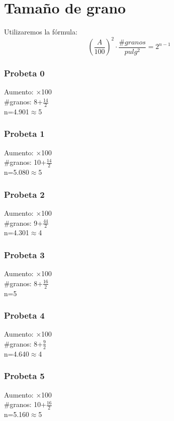 \documentclass[a4paper,12pt]{report}
\begin{document}
\section{Tamaño de grano}
Utilizaremos la fórmula:
$$
\left(\frac{A}{100}\right)^{2}\cdot\frac{\#granos}{pulg^{2}}=2^{n-1}
$$
\subsubsection{Probeta 0}
\hspace{-19pt}Aumento: $\times$100\\
$\#$granos: 8+$\frac{14}{2}$\\
n=4.901$\approx$5
\subsubsection{Probeta 1}
\hspace{-19pt}Aumento: $\times$100\\
$\#$granos: 10+$\frac{14}{2}$\\
n=5.080$\approx$5
\subsubsection{Probeta 2}
\hspace{-19pt}Aumento: $\times$100\\
$\#$granos: 9+$\frac{44}{2}$\\
n=4.301$\approx$4
\subsubsection{Probeta 3}
\hspace{-19pt}Aumento: $\times$100\\
$\#$granos: 8+$\frac{16}{2}$\\
n=5
\subsubsection{Probeta 4}
\hspace{-19pt}Aumento: $\times$100\\
$\#$granos: 8+$\frac{9}{2}$\\
n=4.640$\approx$4
\subsubsection{Probeta 5}
\hspace{-19pt}Aumento: $\times$100\\
$\#$granos: 10+$\frac{16}{2}$\\
n=5.160$\approx$5
\end{document}
